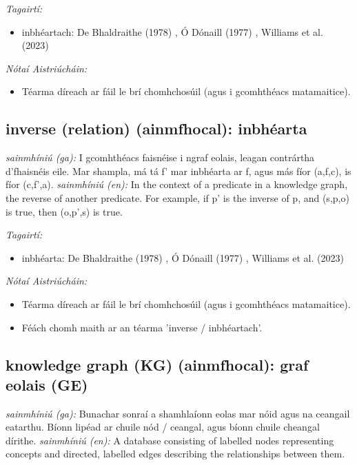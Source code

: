 \documentclass{article}
\begin{document}
 \noindent \textit{Tagairtí:}
\begin{itemize}
	\item inbhéartach: De Bhaldraithe (1978) \cite{de-bhaldraithe}, Ó Dónaill (1977) \cite{odonaill}, Williams et al. (2023) \cite{storchiste}
\end{itemize}

 \noindent \textit{Nótaí Aistriúcháin:}
\begin{itemize}
	\item Téarma díreach ar fáil le brí chomhchosúil (agus i gcomhthéacs matamaitice).
\end{itemize}


\subsection*{inverse (relation) (ainmfhocal): inbhéarta} 
 \noindent \textit{sainmhíniú (ga):} I gcomhthéacs faisnéise i ngraf eolais, leagan contrártha d'fhaisnéis eile. Mar shampla, má tá f' mar inbhéarta ar f, agus más fíor (a,f,c), is fíor (c,f',a).
\newline\newline
 \noindent \textit{sainmhíniú (en):} In the context of a predicate in a knowledge graph, the reverse of another predicate. For example, if p' is the inverse of p, and (s,p,o) is true, then (o,p',s) is true.
\newline

 \noindent \textit{Tagairtí:}
\begin{itemize}
	\item inbhéarta: De Bhaldraithe (1978) \cite{de-bhaldraithe}, Ó Dónaill (1977) \cite{odonaill}, Williams et al. (2023) \cite{storchiste}
\end{itemize}

 \noindent \textit{Nótaí Aistriúcháin:}
\begin{itemize}
	\item Téarma díreach ar fáil le brí chomhchosúil (agus i gcomhthéacs matamaitice).
	\item Féách chomh maith ar an téarma 'inverse / inbhéartach'.
\end{itemize}


\subsection*{knowledge graph (KG) (ainmfhocal): graf eolais (GE)} 
 \noindent \textit{sainmhíniú (ga):} Bunachar sonraí a shamhlaíonn eolas mar nóid agus na ceangail eatarthu. Bíonn lipéad ar chuile nód / ceangal, agus bíonn chuile cheangal dírithe.
\newline\newline
 \noindent \textit{sainmhíniú (en):} A database consisting of labelled nodes representing concepts and directed, labelled edges describing the relationships between them.
\newline
\end{document}
